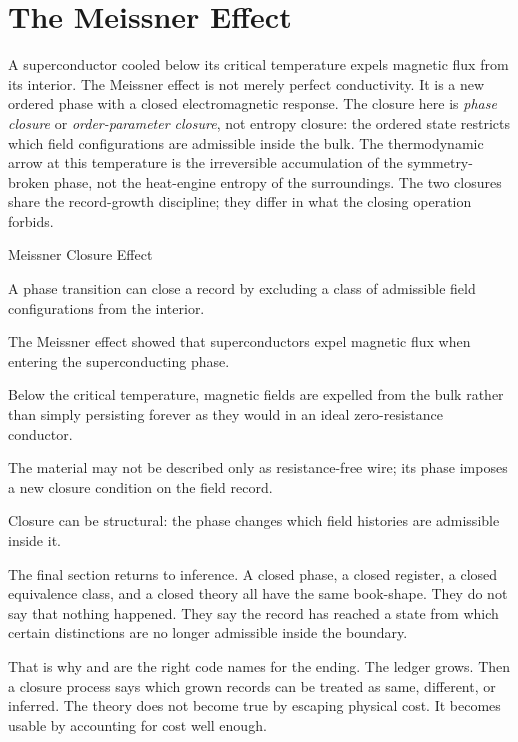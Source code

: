 \section{The Meissner Effect}
\label{se:the-meissner-effect}

A superconductor cooled below its critical temperature expels magnetic flux
from its interior. The Meissner effect is not merely perfect conductivity. It
is a new ordered phase with a closed electromagnetic response. The closure here
is \emph{phase closure} or \emph{order-parameter closure}, not entropy
closure: the ordered state restricts which field configurations are
admissible inside the bulk. The thermodynamic arrow at this temperature
is the irreversible accumulation of the symmetry-broken phase, not the
heat-engine entropy of the surroundings. The two closures share the
record-growth discipline; they differ in what the closing operation
forbids.

\begin{phenom}{Meissner Closure Effect}
\label{ph:meissner-closure-effect}

\PhStatement A phase transition can close a record by excluding a class of
admissible field configurations from the interior.

\PhOrigin The Meissner effect showed that superconductors expel magnetic flux
when entering the superconducting phase.

\PhObservation Below the critical temperature, magnetic fields are expelled
from the bulk rather than simply persisting forever as they would in an ideal
zero-resistance conductor.

\PhConstraint The material may not be described only as resistance-free wire;
its phase imposes a new closure condition on the field record.

\PhConsequence Closure can be structural: the phase changes which field
histories are admissible inside it.

\end{phenom}

The final section returns to inference. A closed phase, a closed register, a
closed equivalence class, and a closed theory all have the same book-shape.
They do not say that nothing happened. They say the record has reached a state
from which certain distinctions are no longer admissible inside the boundary.

That is why  and  are the
right code names for the ending. The ledger grows. Then a closure process says
which grown records can be treated as same, different, or inferred. The theory
does not become true by escaping physical cost. It becomes usable by accounting
for cost well enough.

